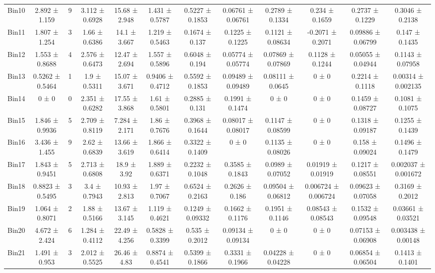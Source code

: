 \begin{tabular}{@{\extracolsep{4pt}}lccccccccccc@{}}
     Bin10 & 2.892 ± 1.159 & 9 & 3.112 ± 0.6928 & 15.68 ± 2.948 & 1.431 ± 0.5787 & 0.5227 ± 0.1853 & 0.06761 ± 0.06761 & 0.2789 ± 0.1334 & 0.234 ± 0.1659 & 0.2737 ± 0.1229 & 0.3046 ± 0.2138 \\ 
     Bin11 & 1.807 ± 1.254 & 3 & 1.66 ± 0.6386 & 14.1 ± 3.667 & 1.219 ± 0.5463 & 0.1674 ± 0.137 & 0.1225 ± 0.1225 & 0.1121 ± 0.08634 & -0.2071 ± 0.2071 & 0.09886 ± 0.06799 & 0.147 ± 0.1435 \\ 
     Bin12 & 1.553 ± 0.8688 & 4 & 2.576 ± 0.6473 & 12.47 ± 2.694 & 1.557 ± 0.5896 & 0.6048 ± 0.194 & 0.05774 ± 0.05774 & 0.07869 ± 0.07869 & 0.1128 ± 0.1244 & 0.05055 ± 0.04944 & 0.1143 ± 0.07958 \\ 
     Bin13 & 0.5262 ± 0.5464 & 1 & 1.9 ± 0.5311 & 15.07 ± 3.671 & 0.9406 ± 0.4712 & 0.5592 ± 0.1853 & 0.09489 ± 0.09489 & 0.08111 ± 0.0645 & 0 ± 0 & 0.2214 ± 0.1118 & 0.00314 ± 0.002135 \\ 
     Bin14 & 0 ± 0 & 0 & 2.351 ± 0.6282 & 17.55 ± 3.868 & 1.61 ± 0.5801 & 0.2885 ± 0.131 & 0.1991 ± 0.1474 & 0 ± 0 & 0 ± 0 & 0.1459 ± 0.08727 & 0.1081 ± 0.1075 \\ 
     Bin15 & 1.846 ± 0.9936 & 5 & 2.709 ± 0.8119 & 7.284 ± 2.171 & 1.86 ± 0.7676 & 0.3968 ± 0.1644 & 0.08017 ± 0.08017 & 0.1147 ± 0.08599 & 0 ± 0 & 0.1318 ± 0.09187 & 0.1255 ± 0.1439 \\ 
     Bin16 & 3.436 ± 1.455 & 9 & 2.62 ± 0.6839 & 13.66 ± 3.619 & 1.866 ± 0.6414 & 0.3322 ± 0.1409 & 0 ± 0 & 0.1135 ± 0.08026 & 0 ± 0 & 0.158 ± 0.09024 & 0.1496 ± 0.1479 \\ 
     Bin17 & 1.843 ± 0.9451 & 5 & 2.713 ± 0.6808 & 18.9 ± 3.92 & 1.889 ± 0.6371 & 0.2232 ± 0.1048 & 0.3585 ± 0.1843 & 0.0989 ± 0.07052 & 0.01919 ± 0.01919 & 0.1217 ± 0.08551 & 0.002037 ± 0.001672 \\ 
     Bin18 & 0.8823 ± 0.5495 & 3 & 3.4 ± 0.7943 & 10.93 ± 2.813 & 1.97 ± 0.7067 & 0.6524 ± 0.2163 & 0.2626 ± 0.186 & 0.09504 ± 0.06812 & 0.006724 ± 0.006724 & 0.09623 ± 0.07058 & 0.3169 ± 0.2012 \\ 
     Bin19 & 1.064 ± 0.8071 & 2 & 1.88 ± 0.5166 & 13.67 ± 3.145 & 1.119 ± 0.4621 & 0.1249 ± 0.09332 & 0.1662 ± 0.1176 & 0.1951 ± 0.1146 & 0.08543 ± 0.08543 & 0.1532 ± 0.09548 & 0.03661 ± 0.03521 \\ 
     Bin20 & 4.672 ± 2.424 & 6 & 1.284 ± 0.4112 & 22.49 ± 4.256 & 0.5828 ± 0.3399 & 0.535 ± 0.2012 & 0.09134 ± 0.09134 & 0 ± 0 & 0 ± 0 & 0.07153 ± 0.06908 & 0.003438 ± 0.00148 \\ 
     Bin21 & 1.491 ± 0.953 & 3 & 2.012 ± 0.5525 & 26.46 ± 4.83 & 0.8874 ± 0.4541 & 0.5399 ± 0.1866 & 0.3331 ± 0.1966 & 0.04228 ± 0.04228 & 0 ± 0 & 0.06854 ± 0.06504 & 0.1413 ± 0.1401 \\ 

\end{tabular}
